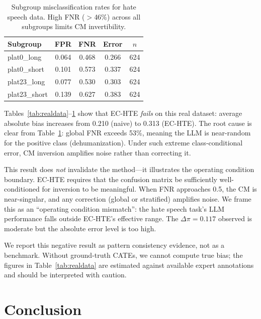 \documentclass[11pt,twocolumn]{article}
\begin{document}
\begin{table}[t]
\centering
\small
\caption{Subgroup misclassification rates for hate speech data. High FNR ($>$46\%) across all subgroups limits CM invertibility.}
\label{tab:realdata_cm}
\begin{tabular}{@{}lcccc@{}}
\toprule
Subgroup & FPR & FNR & Error & $n$ \\
\midrule
plat0\_long & 0.064 & 0.468 & 0.266 & 624 \\
plat0\_short & 0.101 & 0.573 & 0.337 & 624 \\
plat23\_long & 0.077 & 0.530 & 0.303 & 624 \\
plat23\_short & 0.139 & 0.627 & 0.383 & 624 \\
\bottomrule
\end{tabular}
\end{table}

Tables~\ref{tab:realdata}--\ref{tab:realdata_cm} show that EC-HTE \emph{fails} on this real dataset: average absolute bias increases from 0.210 (naive) to 0.313 (EC-HTE). The root cause is clear from Table~\ref{tab:realdata_cm}: global FNR exceeds 53\%, meaning the LLM is near-random for the positive class (dehumanization). Under such extreme class-conditional error, CM inversion amplifies noise rather than correcting it.

This result does \emph{not} invalidate the method---it illustrates the operating condition boundary. EC-HTE requires that the confusion matrix be sufficiently well-conditioned for inversion to be meaningful. When FNR approaches 0.5, the CM is near-singular, and any correction (global or stratified) amplifies noise. We frame this as an ``operating condition mismatch'': the hate speech task's LLM performance falls outside EC-HTE's effective range. The $\Delta\pi{=}0.117$ observed is moderate but the absolute error level is too high.

We report this negative result as pattern consistency evidence, not as a benchmark. Without ground-truth CATEs, we cannot compute true bias; the figures in Table~\ref{tab:realdata} are estimated against available expert annotations and should be interpreted with caution.

\section{Conclusion}
\end{document}
